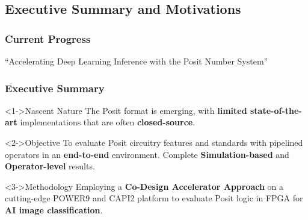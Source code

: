 \graphicspath{{../../../PhD/paper_factory/thesis_louis/Chapter3/Figs/}}

\subsection{Executive Summary and Motivations}
\begin{frame}
    \frametitle{Current Progress}

    \centering
    \huge ``Accelerating Deep Learning Inference with the Posit Number System''
    \normalsize

    \vspace{1em} %

    \tableofcontents[currentsection,
                     subsectionstyle=show/shaded/hide,
                     sectionstyle=show/hide]

\end{frame}
\begin{frame}
    \frametitle{Executive Summary}

    \begin{exampleblock}<1->{Nascent Nature}
	    The Posit format is emerging, with \textbf{limited state-of-the-art} implementations that are often \textbf{closed-source}.
    \end{exampleblock}

    \begin{block}<2->{Objective}
	    To evaluate Posit circuitry features and standards with pipelined operators in an \textbf{end-to-end} environment.
	    Complete \textbf{Simulation-based} and \textbf{Operator-level} results.
    \end{block}

    \begin{alertblock}<3->{Methodology}
	    Employing a \textbf{Co-Design Accelerator Approach} on a cutting-edge POWER9 and CAPI2 platform to evaluate Posit logic in FPGA for \textbf{AI image classification}.
    \end{alertblock}

\end{frame}

